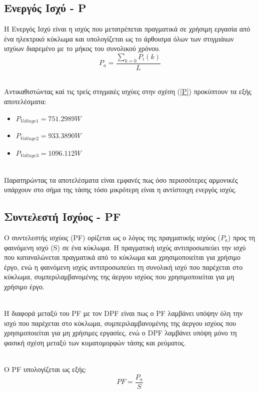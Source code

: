 \subsection*{Ενεργός Ισχύ - P}
\label{ex4q5}
Η Ενεργός Ισχύ είναι η ισχύς που μετατρέπεται πραγματικά σε χρήσιμη εργασία από ένα ηλεκτρικό κύκλωμα και υπολογίζεται ως το άρθοισμα όλων των στιγμιάιων ισχύων διαρεμένο με το μήκος του συνολικού χρόνου. 
\begin{equation}
    P_{a} =\frac{\sum_{k=0}^{} P_{i}(k)}{L} \label{P}
\end{equation}

\noindent\\
Αντικαθιστώντας καί τις τρείς στιγμαιές ισχύες στην σχέση (\ref{P}) προκύπτουν τα εξής αποτελέσματα:
\begin{itemize}
    \item $P_{Voltage1} = 751.2989W$
    \item $P_{Voltage2} = 933.3890W$
    \item $P_{Voltage3} = 1096.112W$
\end{itemize}

\noindent\\
Παρατηρώντας τα αποτελέσματα είναι εμφανές πως όσο περισσότερες αρμονικές υπάρχουν στο σήμα της τάσης τόσο μικρότερη είναι η αντίστοιχη ενεργός ισχύς.


\subsection*{Συντελεστή Ισχύος - PF}
\label{ex4q6}
Ο συντελεστής ισχύος (PF) ορίζεται ως ο λόγος της πραγματικής ισχύος ($P_{a}$) προς τη φαινόμενη ισχύ (S) σε ένα κύκλωμα. Η πραγματική ισχύς αντιπροσωπεύει την ισχύ που καταναλώνεται πραγματικά από το κύκλωμα και χρησιμοποιείται για χρήσιμο έργο, ενώ η φαινόμενη ισχύς αντιπροσωπεύει τη συνολική ισχύ που παρέχεται στο κύκλωμα, συμπεριλαμβανομένης της άεργου ισχύος που χρησιμοποιείται για μη χρήσιμο έργο.

\noindent\\
Η διαφορά μεταξύ του PF με τον  DPF είναι πως ο PF λαμβάνει υπόψην όλη την ισχύ που παρέχεται στο κύκλωμα, συμπεριλαμβανομένης της άεργου ισχύος που χρησιμοποιείται για μη χρήσιμες εργασίες, ενώ ο DPF λαμβάνει υπόψη μόνο τη φασική σχέση μεταξύ των κυματομορφών τάσης και ρεύματος.

\noindent\\
O PF υπολογίζεται ως εξής:
\begin{equation} 
    PF=\frac{P_{a}}{S} \label{PF}
\end{equation} 

